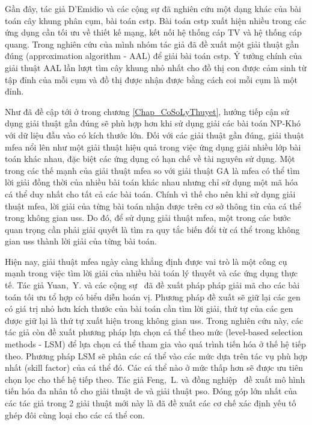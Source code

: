 Gần đây, tác giả D'Emidio và các cộng sự \cite{demidio_clustered_2016} đã nghiên cứu một dạng khác của bài toán cây khung phân cụm, bài toán \gls{cstp}. Bài toán \gls{cstp} xuất hiện nhiều trong các ứng dụng cần tối ưu về thiết kế mạng, kết nối hệ thống cáp TV và hệ thống cáp quang. Trong nghiên cứu của mình nhóm tác giả đã đề xuất một giải thuật gần đúng (approximation algorithm - AAL) để giải bài toán \gls{cstp}. Ý tưởng chính của giải thuật AAL lần lượt tìm cây khung nhỏ nhất cho đồ thị con được cảm sinh từ tập đỉnh của mỗi cụm và đồ thị được nhận được bằng cách coi mỗi cụm là một đỉnh.

Như đã đề cập tới ở trong chương \ref{Chap_CoSoLyThuyet}, hướng tiếp cận sử dụng giải thuật gần đúng sẽ phù hợp hơn khi sử dụng giải các bài toán NP-Khó với dữ liệu đầu vào có kích thước lớn. Đối với các giải thuật gần đúng, giải thuật \gls{mfea} nổi lên như một giải thuật hiệu quả trong việc ứng dụng giải nhiều lớp bài toán khác nhau, đặc biệt các ứng dụng có hạn chế về tài nguyên sử dụng. Một trong các thế mạnh của giải thuật \gls{mfea} so với giải thuật GA là \gls{mfea} có thể tìm lời giải đồng thời của nhiều bài toán khác nhau nhưng chỉ sử dụng một mã hóa cá thể duy nhất cho tất cả các bài toán. Chính vì thế cho nên khi sử dụng giải thuật \gls{mfea}, lời giải của từng bài toán nhận được trên cơ sở thông tin của cá thể trong không gian \gls{uss}. Do đó, để sử dụng giải thuật \gls{mfea}, một trong các bước quan trọng cần phải giải quyết là tìm ra quy tắc biến đổi từ cá thể trong không gian \gls{uss} thành lời giải của từng bài toán. 

Hiện nay, giải thuật \gls{mfea} ngày càng khẳng định được vai trò là một công cụ mạnh trong việc tìm lời giải của nhiều bài toán lý thuyết và các ứng dụng thực tế. Tác giả Yuan,~Y. và các cộng sự~\cite{yuan2016evolutionary} đã đề xuất pháp pháp giải mã cho các bài toán tối ưu tổ hợp có biểu diễn hoán vị. Phương pháp đề xuất sẽ giữ lại các gen có giá trị nhỏ hơn kích thước của bài toán cần tìm lời giải, thứ tự của các gen được giữ lại là thứ tự xuất hiện trong không gian \gls{uss}. Trong nghiên cứu này, các tác giả còn đề xuất phương pháp lựa chọn cá thể theo mức (level-based selection methods - LSM) để lựa chọn cá thể tham gia vào quá trình tiến hóa ở thế hệ tiếp theo. Phương pháp LSM sẽ phân các cá thể vào các mức dựa trên tác vụ phù hợp nhất (skill factor) của cá thể đó. Các cá thể nào ở mức thấp hơn sẽ được ưu tiên chọn lọc cho thế hệ tiếp theo. Tác giả Feng,~L. và đồng nghiệp~\cite{feng2017empirical} đề xuất mô hình tiến hóa đa nhân tố cho giải thuật \gls{de} và giải thuật \gls{pso}. Đóng góp lớn nhất của các tác giả trong 2 giải thuật mới này là đã đề xuất các cơ chế xác định yếu tố ghép đôi cùng loại cho các cá thể con.





